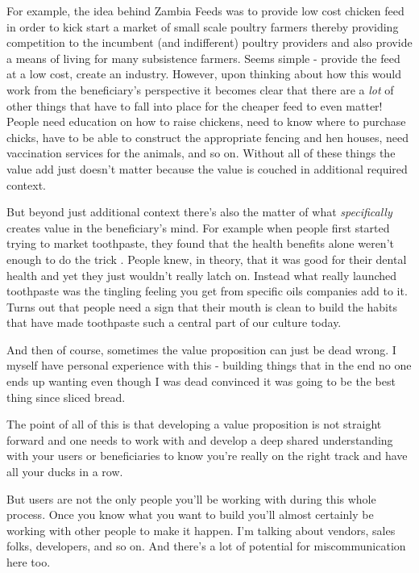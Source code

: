 \documentclass[11pt,a5paper]{book}
\begin{document}
For example, the idea behind Zambia Feeds \cite{macmillan} was to provide low cost chicken feed in order to kick start a market of small scale poultry farmers thereby providing competition to the incumbent (and indifferent) poultry providers and also provide a means of living for many subsistence farmers. Seems simple - provide the feed at a low cost, create an industry. However, upon thinking about how this would work from the beneficiary's perspective it becomes clear that there are a \textit{lot} of other things that have to fall into place for the cheaper feed to even matter! People need education on how to raise chickens, need to know where to purchase chicks, have to be able to construct the appropriate fencing and hen houses, need vaccination services for the animals, and so on. Without all of these things the value add just doesn't matter because the value is couched in additional required context. 
\newline

But beyond just additional context there's also the matter of what \textit{specifically} creates value in the beneficiary's mind. For example when people first started trying to market toothpaste, they found that the health benefits alone weren't enough to do the trick \cite{duhigg}. People knew, in theory, that it was good for their dental health and yet they just wouldn't really latch on. Instead what really launched toothpaste was the tingling feeling you get from specific oils companies add to it. Turns out that people need a sign that their mouth is clean to build the habits that have made toothpaste such a central part of our culture today. 
\newline

And then of course, sometimes the value proposition can just be dead wrong. I myself have personal experience with this - building things that in the end no one ends up wanting even though I was dead convinced it was going to be the best thing since sliced bread.
\newline

The point of all of this is that developing a value proposition is not straight forward and one needs to work with and develop a deep shared understanding with your users or beneficiaries to know you're really on the right track and have all your ducks in a row.
\newline

But users are not the only people you'll be working with during this whole process. Once you know what you want to build you'll almost certainly be working with other people to make it happen. I'm talking about vendors, sales folks, developers, and so on. And there's a lot of potential for miscommunication here too. 
\newline
\end{document}
